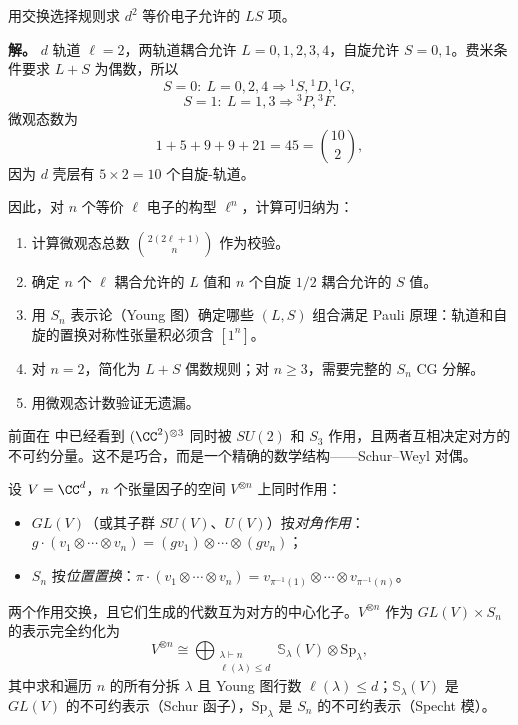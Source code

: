 \begin{workedexample}
用交换选择规则求 $d^2$ 等价电子允许的 $LS$ 项。

\textbf{解。} $d$ 轨道 $\ell=2$，两轨道耦合允许 $L=0,1,2,3,4$，自旋允许 $S=0,1$。费米条件要求 $L+S$ 为偶数，所以
\[
S=0:\ L=0,2,4\Rightarrow {}^1S,{}^1D,{}^1G,
\]
\[
S=1:\ L=1,3\Rightarrow {}^3P,{}^3F.
\]
微观态数为
\[
1+5+9+9+21=45=\binom{10}{2},
\]
因为 $d$ 壳层有 $5\times2=10$ 个自旋-轨道。
\end{workedexample}


因此，对 $n$ 个等价 $\ell$ 电子的构型 $\ell^n$，计算可归纳为：
\begin{enumerate}[label=(\arabic*),leftmargin=2.5em]
\item 计算微观态总数 $\binom{2(2\ell+1)}{n}$ 作为校验。
\item 确定 $n$ 个 $\ell$ 耦合允许的 $L$ 值和 $n$ 个自旋 $1/2$ 耦合允许的 $S$ 值。
\item 用 $S_n$ 表示论（Young 图）确定哪些 $(L,S)$ 组合满足 Pauli 原理：轨道和自旋的置换对称性张量积必须含 $[1^n]$。
\item 对 $n=2$，简化为 $L+S$ 偶数规则；对 $n\ge3$，需要完整的 $S_n$ CG 分解。
\item 用微观态计数验证无遗漏。
\end{enumerate}

前面在  中已经看到 $(\CC^2)^{\otimes3}$ 同时被 $SU(2)$ 和 $S_3$ 作用，且两者互相决定对方的不可约分量。这不是巧合，而是一个精确的数学结构——Schur--Weyl 对偶。

\begin{theorem}
设 $V=\CC^d$，$n$ 个张量因子的空间 $V^{\otimes n}$ 上同时作用：
\begin{itemize}
\item $GL(V)$（或其子群 $SU(V)$、$U(V)$）按\emph{对角作用}：$g\cdot(v_1\otimes\cdots\otimes v_n)=(gv_1)\otimes\cdots\otimes(gv_n)$；
\item $S_n$ 按\emph{位置置换}：$\pi\cdot(v_1\otimes\cdots\otimes v_n)=v_{\pi^{-1}(1)}\otimes\cdots\otimes v_{\pi^{-1}(n)}$。
\end{itemize}
两个作用交换，且它们生成的代数互为对方的中心化子。$V^{\otimes n}$ 作为 $GL(V)\times S_n$ 的表示完全约化为
\begin{equation}
V^{\otimes n}
\cong\bigoplus_{\substack{\lambda\vdash n\\\ell(\lambda)\le d}}
\mathbb{S}_\lambda(V)\otimes\mathrm{Sp}_\lambda,
\label{eq:schur-weyl}
\end{equation}
其中求和遍历 $n$ 的所有分拆 $\lambda$ 且 Young 图行数 $\ell(\lambda)\le d$；$\mathbb{S}_\lambda(V)$ 是 $GL(V)$ 的不可约表示（Schur 函子），$\mathrm{Sp}_\lambda$ 是 $S_n$ 的不可约表示（Specht 模）。
\label{thm:schur-weyl}
\end{theorem}


